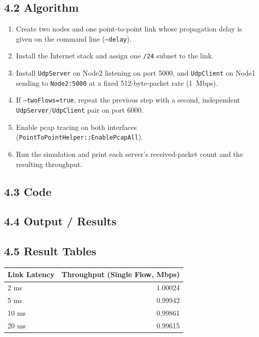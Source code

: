 \documentclass[11pt]{article}
\begin{document}
\subsection*{4.2 Algorithm}
\begin{enumerate}
  \item Create two nodes and one point-to-point link whose propagation delay
        is given on the command line (\texttt{--delay}).
  \item Install the Internet stack and assign one \texttt{/24} subnet to the
        link.
  \item Install \texttt{UdpServer} on Node2 listening on port 5000, and
        \texttt{UdpClient} on Node1 sending to \texttt{Node2:5000} at a fixed
        512-byte-packet rate (1~Mbps).
  \item If \texttt{--twoFlows=true}, repeat the previous step with a second,
        independent \texttt{UdpServer}/\texttt{UdpClient} pair on port 6000.
  \item Enable pcap tracing on both interfaces
        (\texttt{PointToPointHelper::EnablePcapAll}).
  \item Run the simulation and print each server's received-packet count and
        the resulting throughput.
\end{enumerate}

\subsection*{4.3 Code}


\subsection*{4.4 Output / Results}


\subsection*{4.5 Result Tables}
\begin{center}
\renewcommand{\arraystretch}{1.2}
\begin{tabular}{lr}
\toprule
\textbf{Link Latency} & \textbf{Throughput (Single Flow, Mbps)} \\
\midrule
2 ms  & 1.00024 \\
5 ms  & 0.99942 \\
10 ms & 0.99861 \\
20 ms & 0.99615 \\
\bottomrule
\end{tabular}
\end{center}
\end{document}
